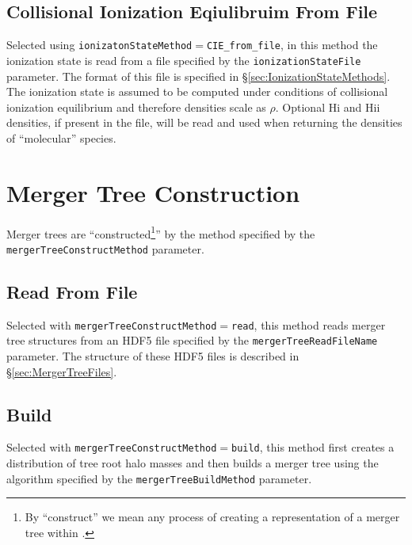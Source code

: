 \subsection{Collisional Ionization Eqiulibruim From File}

Selected using {\tt ionizatonStateMethod}$=${\tt CIE\_from\_file}, in this method the ionization state is read from a file specified by the {\tt ionizationStateFile} parameter. The format of this file is specified in \S\ref{sec:IonizationStateMethods}. The ionization state is assumed to be computed under conditions of collisional ionization equilibrium and therefore densities scale as $\rho$. Optional H{\sc i} and H{\sc ii} densities, if present in the file, will be read and used when returning the densities of ``molecular'' species.

\section{Merger Tree Construction}

Merger trees are ``constructed\footnote{By ``construct'' we mean any process of creating a representation of a merger tree within \protect\glc.}'' by the method specified by the {\tt mergerTreeConstructMethod} parameter.

\subsection{Read From File}

Selected with {\tt mergerTreeConstructMethod}$=${\tt read}, this method reads merger tree structures from an HDF5 file specified by the {\tt mergerTreeReadFileName} parameter. The structure of these HDF5 files is described in \S\ref{sec:MergerTreeFiles}.

\subsection{Build}

Selected with {\tt mergerTreeConstructMethod}$=${\tt build}, this method first creates a distribution of tree root halo masses and then builds a merger tree using the algorithm specified by the {\tt mergerTreeBuildMethod} parameter.

